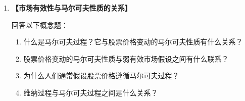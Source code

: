 \documentclass{article}
\begin{document}
\begin{enumerate}[label=\textbf{\arabic*.}]
设某股票当前价格 \(S = 100\) 元，期望收益率 \(\mu = 0.10\)，波动率 \(\sigma = 0.30\)，时间间隔 \(T - t = 1\) 年。

已知：

\[
\ln S_T \sim \phi \left[ \ln S + \left( \mu - \frac{\sigma^2}{2} \right)(T-t), \; \sigma \sqrt{T-t} \right]
\]

\begin{enumerate}[label=(\arabic*)]
    \item 求 \(\ln S_T\) 的均值和标准差；
    \item 求 \(S_T > 110\) 的概率（用标准正态分布表示即可，不必查表）。
\end{enumerate}



\item  {\bf{【市场有效性与马尔可夫性质的关系】}} %

回答以下概念题：

\begin{enumerate}[label=(\arabic*)]
    \item 什么是马尔可夫过程？它与股票价格变动的马尔可夫性质有什么关系？
    \item 股票价格变动的马尔可夫性质与弱有效市场假设之间有什么联系？
    \item 为什么人们通常假设股票价格遵循马尔可夫过程？
    \item 维纳过程与马尔可夫过程之间是什么关系？
\end{enumerate}

\end{enumerate}
\end{document}
